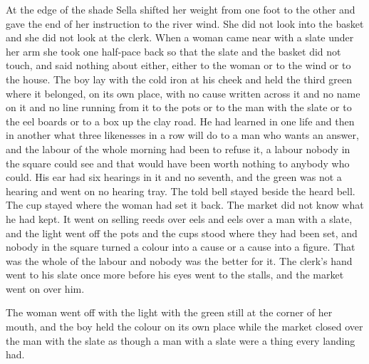 At the edge of the shade Sella shifted her weight from one foot to the other and gave the end of her instruction to the river wind. She did not look into the basket and she did not look at the clerk. When a woman came near with a slate under her arm she took one half-pace back so that the slate and the basket did not touch, and said nothing about either, either to the woman or to the wind or to the house. The boy lay with the cold iron at his cheek and held the third green where it belonged, on its own place, with no cause written across it and no name on it and no line running from it to the pots or to the man with the slate or to the eel boards or to a box up the clay road. He had learned in one life and then in another what three likenesses in a row will do to a man who wants an answer, and the labour of the whole morning had been to refuse it, a labour nobody in the square could see and that would have been worth nothing to anybody who could. His ear had six hearings in it and no seventh, and the green was not a hearing and went on no hearing tray. The told bell stayed beside the heard bell. The cup stayed where the woman had set it back. The market did not know what he had kept. It went on selling reeds over eels and eels over a man with a slate, and the light went off the pots and the cups stood where they had been set, and nobody in the square turned a colour into a cause or a cause into a figure. That was the whole of the labour and nobody was the better for it. The clerk's hand went to his slate once more before his eyes went to the stalls, and the market went on over him.

The woman went off with the light with the green still at the corner of her mouth, and the boy held the colour on its own place while the market closed over the man with the slate as though a man with a slate were a thing every landing had.
